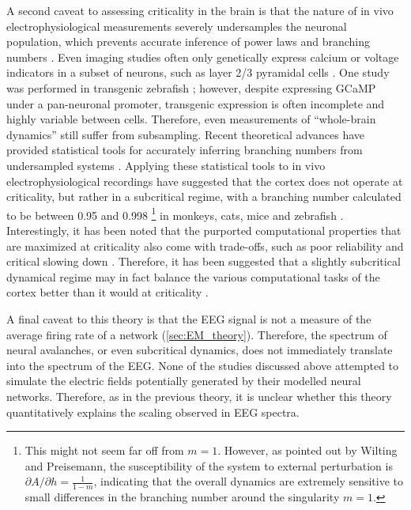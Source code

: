 A second caveat to assessing criticality in the brain is that the nature of in vivo electrophysiological measurements severely undersamples the neuronal population, which prevents accurate inference of power laws and branching numbers \cite{Priesemann2009}. Even imaging studies often only genetically express calcium or voltage indicators in a subset of neurons, such as layer 2/3 pyramidal cells \cite{Scott2014,Bellay2015}. One study was performed in transgenic zebrafish \cite{Ponce-Alvarez2018}; however, despite expressing GCaMP under a pan-neuronal promoter, transgenic expression is often incomplete and highly variable between cells. Therefore, even measurements of ``whole-brain dynamics'' still suffer from subsampling. Recent theoretical advances have provided statistical tools for accurately inferring branching numbers from undersampled systems \cite{Wilting2018}. Applying these statistical tools to in vivo electrophysiological recordings have suggested that the cortex does not operate at criticality, but rather in a subcritical regime, with a branching number calculated to be between 0.95 and 0.998 \footnote[2]{This might not seem far off from $m=1$. However, as pointed out by Wilting and Preisemann\cite{Wilting2019}, the susceptibility of the system to external perturbation is $\partial A/\partial h = \frac{1}{1-m}$, indicating that the overall dynamics are extremely sensitive to small differences in the branching number around the singularity $m=1$.} in monkeys, cats, mice \cite{Wilting2018,Wilting2019} and zebrafish \cite{Suryadi2022}. Interestingly, it has been noted that the purported computational properties that are maximized at criticality also come with trade-offs, such as poor reliability \cite{Gollo2017} and critical slowing down \cite{Scheffer2012, Wilting2019a}. Therefore, it has been suggested that a slightly subcritical dynamical regime may in fact balance the various computational tasks of the cortex better than it would at criticality \cite{Wilting2019a}.

A final caveat to this theory is that the EEG signal is not a measure of the average firing rate of a network (\autoref{sec:EM_theory}). Therefore, the spectrum of neural avalanches, or even subcritical dynamics, does not immediately translate into the spectrum of the EEG. None of the studies discussed above attempted to simulate the electric fields potentially generated by their modelled neural networks.  Therefore, as in the previous theory, it is unclear whether this theory quantitatively explains the scaling observed in EEG spectra.

